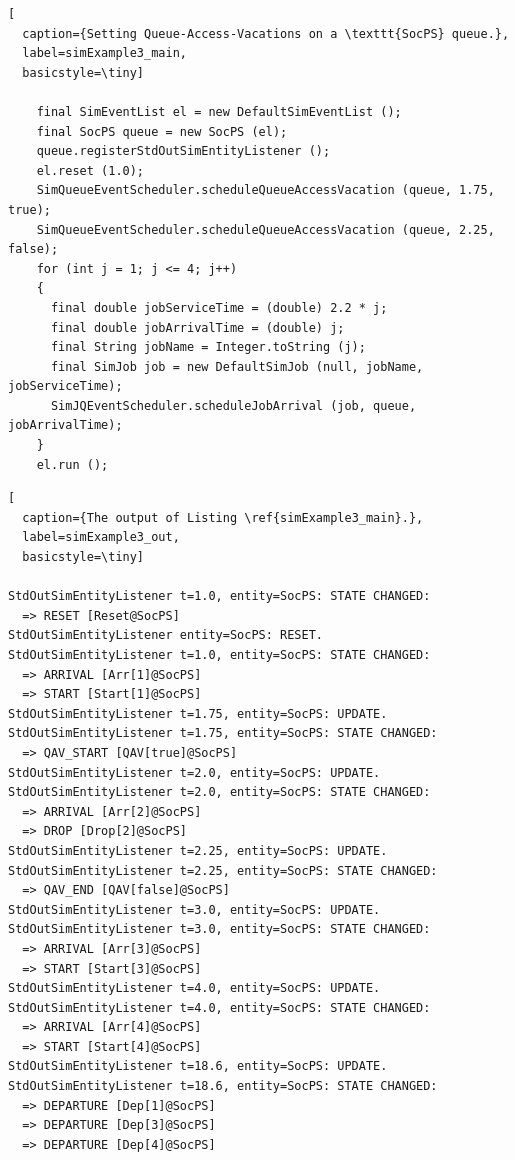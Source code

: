 \begin{lstfloat}
\begin{lstlisting}[
  caption={Setting Queue-Access-Vacations on a \texttt{SocPS} queue.},
  label=simExample3_main,
  basicstyle=\tiny]

    final SimEventList el = new DefaultSimEventList ();
    final SocPS queue = new SocPS (el);
    queue.registerStdOutSimEntityListener ();
    el.reset (1.0);
    SimQueueEventScheduler.scheduleQueueAccessVacation (queue, 1.75, true);
    SimQueueEventScheduler.scheduleQueueAccessVacation (queue, 2.25, false);
    for (int j = 1; j <= 4; j++)
    {
      final double jobServiceTime = (double) 2.2 * j;
      final double jobArrivalTime = (double) j;
      final String jobName = Integer.toString (j);
      final SimJob job = new DefaultSimJob (null, jobName, jobServiceTime);
      SimJQEventScheduler.scheduleJobArrival (job, queue, jobArrivalTime);
    }
    el.run ();

\end{lstlisting}
\end{lstfloat}
  
\begin{lstfloat}
\begin{lstlisting}[
  caption={The output of Listing \ref{simExample3_main}.},
  label=simExample3_out,
  basicstyle=\tiny]

StdOutSimEntityListener t=1.0, entity=SocPS: STATE CHANGED:
  => RESET [Reset@SocPS]
StdOutSimEntityListener entity=SocPS: RESET.
StdOutSimEntityListener t=1.0, entity=SocPS: STATE CHANGED:
  => ARRIVAL [Arr[1]@SocPS]
  => START [Start[1]@SocPS]
StdOutSimEntityListener t=1.75, entity=SocPS: UPDATE.
StdOutSimEntityListener t=1.75, entity=SocPS: STATE CHANGED:
  => QAV_START [QAV[true]@SocPS]
StdOutSimEntityListener t=2.0, entity=SocPS: UPDATE.
StdOutSimEntityListener t=2.0, entity=SocPS: STATE CHANGED:
  => ARRIVAL [Arr[2]@SocPS]
  => DROP [Drop[2]@SocPS]
StdOutSimEntityListener t=2.25, entity=SocPS: UPDATE.
StdOutSimEntityListener t=2.25, entity=SocPS: STATE CHANGED:
  => QAV_END [QAV[false]@SocPS]
StdOutSimEntityListener t=3.0, entity=SocPS: UPDATE.
StdOutSimEntityListener t=3.0, entity=SocPS: STATE CHANGED:
  => ARRIVAL [Arr[3]@SocPS]
  => START [Start[3]@SocPS]
StdOutSimEntityListener t=4.0, entity=SocPS: UPDATE.
StdOutSimEntityListener t=4.0, entity=SocPS: STATE CHANGED:
  => ARRIVAL [Arr[4]@SocPS]
  => START [Start[4]@SocPS]
StdOutSimEntityListener t=18.6, entity=SocPS: UPDATE.
StdOutSimEntityListener t=18.6, entity=SocPS: STATE CHANGED:
  => DEPARTURE [Dep[1]@SocPS]
  => DEPARTURE [Dep[3]@SocPS]
  => DEPARTURE [Dep[4]@SocPS]

\end{lstlisting}
\end{lstfloat}

